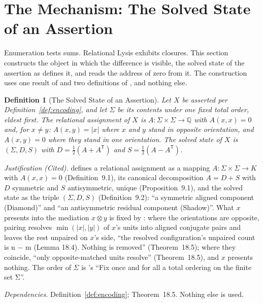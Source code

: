 \documentclass[pdflatex,sn-mathphys-num]{sn-jnl}
\theoremstyle{thmstyleone}%
\theoremstyle{thmstyletwo}%
\theoremstyle{thmstylethree}%
\newtheorem{definition}{Definition}[section]
\newtheorem{definition}{Definition}[section]
\newcommand{\PA}{\cite{Swanagon2026PA}}
\newcommand{\q}[1]{``#1''}        %
\newcommand{\qq}[1]{``#1''}       %
\newcommand{\YM}{\cite{Swanagon2026YangMills}}
\newcommand{\deps}[1]{\par\begin{sloppypar}\noindent\emph{Dependencies.} #1 Nothing else is used.\end{sloppypar}}
\begin{document}
\section{The Mechanism: The Solved State of an Assertion}\label{sec:solved}
Enumeration tests sums. Relational Lysis exhibits closures. This section constructs the object in which the difference is visible, the solved state of the assertion as \YM{} defines it, and reads the address of zero from it. The construction uses one result of \PA{} and two definitions of \YM{}, and nothing else.

\begin{definition}[The Solved State of an Assertion]\label{def:solved}
Let $X$ be asserted per Definition~\ref{def:encoding}, and let $\Sigma$ be its contents under one fixed total order, eldest first. The \emph{relational assignment} of $X$ is $A:\Sigma\times\Sigma\to\mathbb{Q}$ with $A(x,x)=0$ and, for $x\ne y$: $A(x,y)=|x|$ where $x$ and $y$ stand in opposite orientation, and $A(x,y)=0$ where they stand in one orientation. The \emph{solved state} of $X$ is $(\Sigma,D,S)$ with $D=\tfrac12(A+A^{\mathsf T})$ and $S=\tfrac12(A-A^{\mathsf T})$.
\end{definition}
\noindent\emph{Justification (Cited).} \YM{} defines a relational assignment as a mapping $A:\Sigma\times\Sigma\to K$ with $A(x,x)=0$ (Definition~9.1), its canonical decomposition $A=D+S$ with $D$ symmetric and $S$ antisymmetric, unique (Proposition~9.1), and the solved state as the triple $(\Sigma,D,S)$ (Definition~9.2): \qq{a symmetric aligned component (Diamond)} and \qq{an antisymmetric residual component (Shadow)}. What $x$ presents into the mediation $x\otimes y$ is fixed by \PA{}: where the orientations are opposite, pairing resolves $\min(|x|,|y|)$ of $x$'s units into aligned conjugate pairs and leaves the rest unpaired on $x$'s side, \q{the resolved configuration's unpaired count is n − m (Lemma 18.4). Nothing is removed} (Theorem~18.5); where they coincide, \q{only opposite-matched units resolve} (Theorem~18.5), and $x$ presents nothing. The order of $\Sigma$ is \YM's \qq{Fix once and for all a total ordering on the finite set Σ}.
\deps{Definition~\ref{def:encoding}; Theorem~18.5.}
\end{document}
